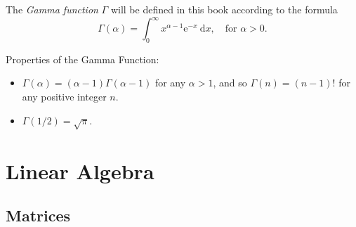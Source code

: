 \documentclass[captions=tableheading]{scrbook}
\begin{document}
The \emph{Gamma function} \(\Gamma\) will be defined in this book according to the formula
\begin{equation}
\Gamma(\alpha)=\int_{0}^{\infty}x^{\alpha-1}\mathrm{e}^{-x}\:\mathrm{d} x,\quad\mbox{for }\alpha > 0.
\end{equation}

\begin{fact}
Properties of the Gamma Function:
\begin{itemize}
\item \(\Gamma(\alpha)=(\alpha - 1)\Gamma(\alpha - 1)\) for any \(\alpha > 1\), and so \(\Gamma(n)=(n-1)!\) for any positive integer \(n\).
\item \(\Gamma(1/2)=\sqrt{\pi}\).
\end{itemize}
\end{fact}
\section{Linear Algebra \label{sec:Linear-Algebra}}
\label{sec-21-5}
\subsection{Matrices}
\label{sec-21-5-1}
\end{document}
